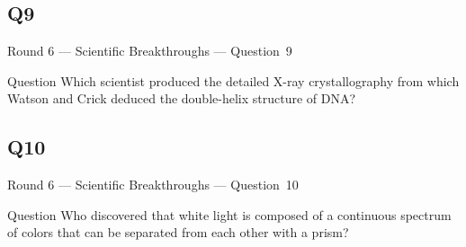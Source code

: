 \documentclass[11pt]{beamer}
\begin{document}
\subsection*{Q9}
\begin{frame}[t]{Round 6 --- Scientific Breakthroughs --- \mbox{Question 9}}
\vspace{-0.5em}
\begin{block}{Question}
Which scientist produced the detailed X-ray crystallography from which Watson and Crick deduced the double-helix structure of DNA\@?
\end{block}
\end{frame}
\subsection*{Q10}
\begin{frame}[t]{Round 6 --- Scientific Breakthroughs --- \mbox{Question 10}}
\vspace{-0.5em}
\begin{block}{Question}
Who discovered that white light is composed of a continuous spectrum of colors that can be separated from each other with a prism?
\end{block}
\end{frame}
\end{document}
